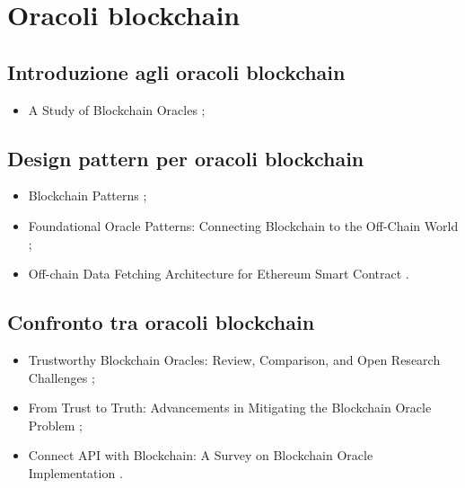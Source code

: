 \clearpage
{}
\section*{Oracoli blockchain}

\subsection*{Introduzione agli oracoli blockchain}
\begin{itemize}

\item A Study of Blockchain Oracles \cite{beniiche2020oracle};

\end{itemize}

\subsection*{Design pattern per oracoli blockchain}
\begin{itemize}

\item Blockchain Patterns \cite{xu2019blockchainpatterns};

\item Foundational Oracle Patterns: Connecting Blockchain to the Off-Chain World \cite{wohrer2020oraclepatterns};

\item Off-chain Data Fetching Architecture for Ethereum Smart Contract \cite{liu2020oraclepatterns}.

\end{itemize}

\subsection*{Confronto tra oracoli blockchain}
\begin{itemize}

\item Trustworthy Blockchain Oracles: Review, Comparison, and Open Research Challenges \cite{albreiki2020oraclescompared};

\item From Trust to Truth: Advancements in Mitigating the Blockchain Oracle Problem \cite{hassan2023oraclescompared};

\item Connect API with Blockchain: A Survey on Blockchain Oracle Implementation \cite{pasdar2023oraclescompared}.

\end{itemize}


